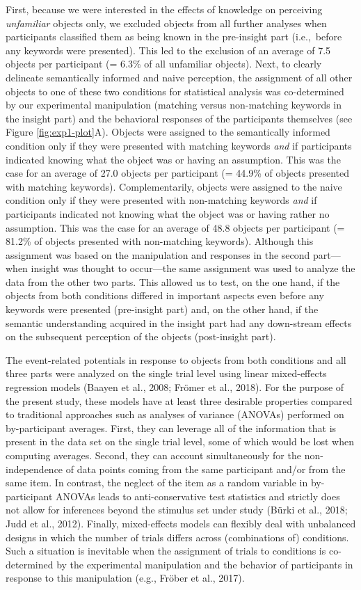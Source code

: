 \documentclass[
  english,
  doc,12pt,twoside,floatsintext]{apa7}
\begin{document}
First, because we were interested in the effects of knowledge on perceiving \emph{unfamiliar} objects only, we excluded objects from all further analyses when participants classified them as being known in the pre-insight part (i.e.,~before any keywords were presented). This led to the exclusion of an average of 7.5 objects per participant (= 6.3\% of all unfamiliar objects). Next, to clearly delineate semantically informed and naive perception, the assignment of all other objects to one of these two conditions for statistical analysis was co-determined by our experimental manipulation (matching versus non-matching keywords in the insight part) and the behavioral responses of the participants themselves (see Figure \ref{fig:exp1-plot}A). Objects were assigned to the semantically informed condition only if they were presented with matching keywords \emph{and} if participants indicated knowing what the object was or having an assumption. This was the case for an average of 27.0 objects per participant (= 44.9\% of objects presented with matching keywords). Complementarily, objects were assigned to the naive condition only if they were presented with non-matching keywords \emph{and} if participants indicated not knowing what the object was or having rather no assumption. This was the case for an average of 48.8 objects per participant (= 81.2\% of objects presented with non-matching keywords). Although this assignment was based on the manipulation and responses in the second part---when insight was thought to occur---the same assignment was used to analyze the data from the other two parts. This allowed us to test, on the one hand, if the objects from both conditions differed in important aspects even before any keywords were presented (pre-insight part) and, on the other hand, if the semantic understanding acquired in the insight part had any down-stream effects on the subsequent perception of the objects (post-insight part).

The event-related potentials in response to objects from both conditions and all three parts were analyzed on the single trial level using linear mixed-effects regression models (Baayen et al., 2008; Frömer et al., 2018). For the purpose of the present study, these models have at least three desirable properties compared to traditional approaches such as analyses of variance (ANOVAs) performed on by-participant averages. First, they can leverage all of the information that is present in the data set on the single trial level, some of which would be lost when computing averages. Second, they can account simultaneously for the non-independence of data points coming from the same participant and/or from the same item. In contrast, the neglect of the item as a random variable in by-participant ANOVAs leads to anti-conservative test statistics and strictly does not allow for inferences beyond the stimulus set under study (Bürki et al., 2018; Judd et al., 2012). Finally, mixed-effects models can flexibly deal with unbalanced designs in which the number of trials differs across (combinations of) conditions. Such a situation is inevitable when the assignment of trials to conditions is co-determined by the experimental manipulation and the behavior of participants in response to this manipulation (e.g., Fröber et al., 2017).
\end{document}
